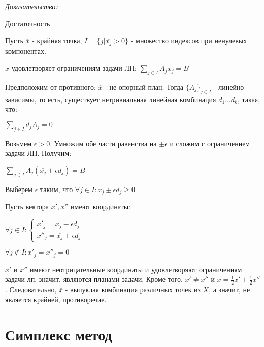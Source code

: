 \documentclass[11pt]{article}
\newenvironment{proof}{
  \textit{Доказательство:}
    
  \begin{adjustwidth}{1em}{}
}{
  \end{adjustwidth}
}
\begin{document}
\begin{sloppypar}
\begin{proof}
\underline{Достаточность}

Пусть $\overline{x}$ - крайняя точка, $I = \{j | \overline{x_j} > 0\}$ - множество индексов при ненулевых компонентах.

$\overline{x}$ удовлетворяет ограничениям задачи ЛП: $\sum_{j \in I} A_j \overline{x_j} = B$

Предположим от противного: $\overline{x}$ - не опорный план. Тогда $\{A_j\}_{j \in I}$ - линейно зависимы, то есть, существует нетривиальная линейная комбинация $d_1 \dots d_k$, такая, что:

$\sum_{j \in I} d_j A_j = 0$

Возьмем $\epsilon > 0$. Умножим обе части равенства на $\pm \epsilon$ и сложим с ограничением задачи ЛП. Получим:

$\sum_{j \in I} A_j (\overline{x_j} \pm \epsilon d_j) = B$

Выберем $\epsilon$ таким, что $\forall j \in I: x_j \pm \epsilon d_j \geq 0$

Пусть вектора $x', x''$ имеют координаты:

$\forall j \in I: \begin{cases}
  x'_j = \overline{x_j} - \epsilon d_j \\
  x''_j = \overline{x_j} + \epsilon d_j
\end{cases}$

$\forall j \notin I: x'_j = x''_j = 0$

$x'$ и $x''$ имеют неотрицательные координаты и удовлетворяют ограничениям задачи лп, значит, являются планами задачи. Кроме того, $x' \neq x''$ и $\overline{x} = \frac{1}{2}x' + \frac{1}{2}x''$. Следовательно, $\overline{x}$ - выпуклая комбинация различных точек из $X$, а значит, не является крайней, противоречие.
\end{proof}

\section*{Симплекс метод}


\end{sloppypar}
\end{document}
